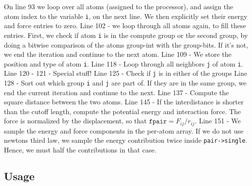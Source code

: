 \documentclass[twoside,english]{uiofysmaster}
\begin{document}
On line 93 we loop over all atoms (assigned to the processor), and assign the atom index to the variable \texttt{i}, on the next line. 
We then explicitly set their energy and force entries to zero. 
Line 102 - we loop through all atoms again, to fill these entries. 
First, we check if atom \texttt{i} is in the compute group or the second group, by doing a bitwise comparison of the atoms group-int with the group-bits. If it's not, we end the iteration and continue to the next atom.
Line 109 - We store the position and type of atom \texttt{i}.
Line 118 - Loop through all neighbors \texttt{j} of atom \texttt{i}.
Line 120 - 121 - Special stuff!
Line 125 - Check if \texttt{j} is in either of the groups
Line 128 - Sort out which group \texttt{i} and \texttt{j} are part of. 
If they are in the same group, we end the current iteration and continue to the next.
Line 137 - Compute the square distance between the two atoms.
Line 145 - If the interdistance is shorter than the cutoff length, compute the potential energy and interaction force. 
The force is normalized by the displacement,  so that $\texttt{fpair}=F_{ij}/r_{ij}$.
Line 151 - We sample the energy and force components in the per-atom array. 
If we do not use newtons third law, we sample the energy contribution twice inside \texttt{pair->single}. Hence, we must half the contributions in that case.


\subsection{Usage}
\end{document}
